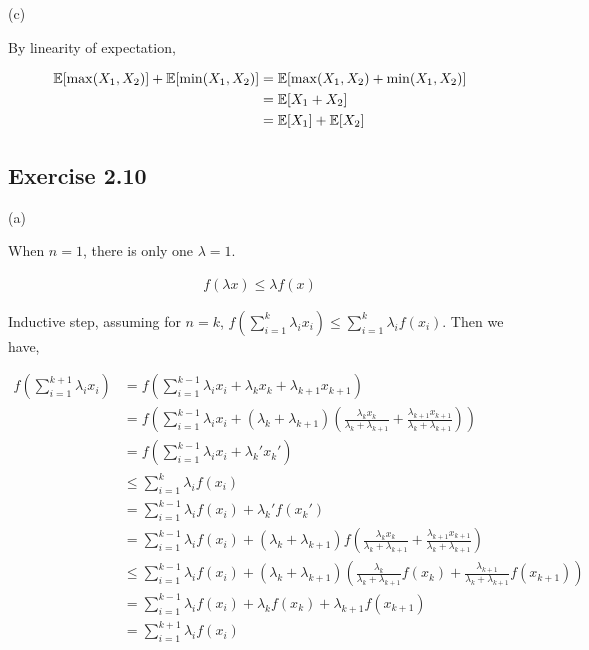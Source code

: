 (c)

By linearity of expectation,

\begin{equation*}
\begin{split}
\mathbb{E}[\max(X_1,X_2)] + \mathbb{E}[\min(X_1,X_2)] & = \mathbb{E}[\max(X_1, X_2) + \min(X_1, X_2)] \\
& = \mathbb{E}[X_1 + X_2]\\
& = \mathbb{E}[X_1] + \mathbb{E}[X_2]
\end{split}
\end{equation*}


\subsection*{Exercise 2.10}

(a)

When $n = 1$, there is only one $\lambda = 1$.

\begin{equation*}
\begin{split}
f(\lambda x) \leq \lambda f(x)
\end{split}
\end{equation*}

Inductive step, assuming for $n = k$, $f(\sum_{i=1}^{k}\lambda_i x_i) \leq \sum_{i=1}^{k}\lambda_i f(x_i)$.
Then we have, 

\begin{equation*}
\begin{split}
f(\sum_{i=1}^{k+1}\lambda_i x_i) & = f(\sum_{i=1}^{k-1}\lambda_i x_i + \lambda_k x_k + \lambda_{k+1} x_{k+1})\\
& = f(\sum_{i=1}^{k-1}\lambda_i x_i + (\lambda_k + \lambda_{k+1})(\frac{\lambda_k x_k}{\lambda_k + \lambda_{k+1}} 
+ \frac{\lambda_{k+1} x_{k+1}}{\lambda_k + \lambda_{k+1}}))\\
& = f(\sum_{i=1}^{k-1}\lambda_i x_i + \lambda_k' x_k') \\
& \leq \sum_{i=1}^{k}\lambda_i f(x_i) \\
& = \sum_{i=1}^{k-1}\lambda_i f(x_i) + \lambda_{k}'f(x_k') \\
& = \sum_{i=1}^{k-1}\lambda_i f(x_i) + (\lambda_k + \lambda_{k+1})f(\frac{\lambda_k x_k}{\lambda_k + \lambda_{k+1}} 
+ \frac{\lambda_{k+1} x_{k+1}}{\lambda_k + \lambda_{k+1}}) \\
& \leq \sum_{i=1}^{k-1}\lambda_i f(x_i) + (\lambda_k + \lambda_{k+1})(\frac{\lambda_k}{\lambda_k + \lambda_{k+1}}f(x_k) 
+ \frac{\lambda_{k+1}}{\lambda_k + \lambda_{k+1}}f(x_{k+1})) \\
& = \sum_{i=1}^{k-1}\lambda_i f(x_i) + \lambda_k f(x_k) 
+ \lambda_{k+1} f(x_{k+1}) \\
& = \sum_{i = 1}^{k+1} \lambda_i f(x_i)
\end{split}
\end{equation*}

